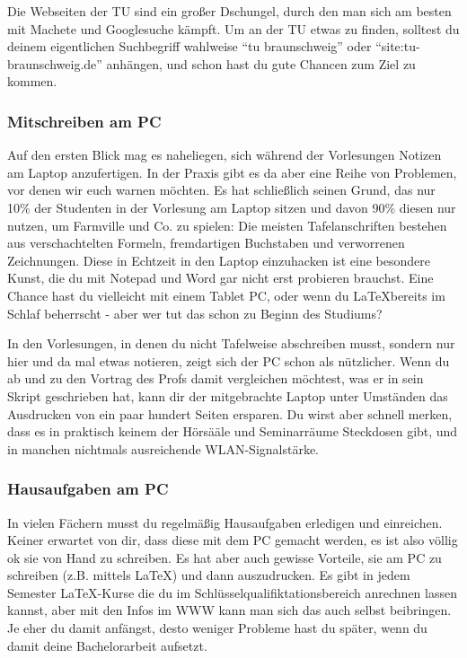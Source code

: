 Die Webseiten der TU sind ein großer Dschungel, durch den man sich am besten 
mit Machete und Googlesuche kämpft. Um an der TU etwas zu finden, solltest 
du deinem eigentlichen Suchbegriff wahlweise "`tu braunschweig"' oder 
"`site:tu-braunschweig.de"' anhängen, und schon hast du gute Chancen zum Ziel 
zu kommen.

\subsubsection{Mitschreiben am PC}
Auf den ersten Blick mag es naheliegen, sich während der Vorlesungen Notizen 
am Laptop anzufertigen. In der Praxis gibt es da aber eine Reihe von Problemen, 
vor denen wir euch warnen möchten. Es hat schließlich seinen Grund, das nur 
10\% der Studenten in der Vorlesung am Laptop sitzen und davon 90\% diesen nur 
nutzen, um Farmville und Co. zu spielen: Die meisten Tafelanschriften bestehen 
aus verschachtelten Formeln, fremdartigen Buchstaben und verworrenen 
Zeichnungen. Diese in Echtzeit in den Laptop einzuhacken ist eine besondere
 Kunst, die du mit Notepad und Word gar nicht erst probieren brauchst. Eine 
 Chance hast du vielleicht mit einem Tablet PC, oder wenn du \LaTeX bereits 
 im Schlaf beherrscht - aber wer tut das schon zu Beginn des Studiums?

In den Vorlesungen, in denen du nicht Tafelweise abschreiben musst, sondern 
nur hier und da mal etwas notieren, zeigt sich der PC schon als nützlicher. 
Wenn du ab und zu den Vortrag des Profs damit vergleichen möchtest, was er 
in sein Skript geschrieben hat, kann dir der mitgebrachte Laptop unter 
Umständen das Ausdrucken von ein paar hundert Seiten ersparen. Du wirst aber 
schnell merken, dass es in praktisch keinem der Hörsääle und Seminarräume 
Steckdosen gibt, und in manchen nichtmals ausreichende WLAN-Signalstärke.

\subsubsection{Hausaufgaben am PC}
In vielen Fächern musst du regelmäßig Hausaufgaben erledigen und einreichen.
Keiner erwartet von dir, dass diese mit dem PC gemacht werden, es ist also
völlig ok sie von Hand zu schreiben. Es hat aber auch gewisse Vorteile, sie
am PC zu schreiben (z.B. mittels \LaTeX) und dann auszudrucken. Es gibt in
jedem Semester \LaTeX-Kurse die du im Schlüsselqualifiktationsbereich 
anrechnen lassen kannst, aber mit den Infos im WWW kann man sich das auch
selbst beibringen. Je eher du damit anfängst, desto weniger Probleme hast
du später, wenn du damit deine Bachelorarbeit aufsetzt.

